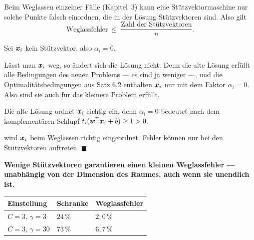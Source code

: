 \begin{merksatz}
Beim Weglassen einzelner Fälle (Kapitel~3) kann eine Stützvektormaschine nur solche Punkte falsch einordnen, die in der Lösung Stützvektoren sind. Also gilt
\[ \text{Weglassfehler} \ \le\ \frac{\text{Zahl der Stützvektoren}}{n} . \]

Sei $\boldsymbol{x}_i$ kein Stützvektor, also $\alpha_i = 0$.

 Lässt man $\boldsymbol{x}_i$ weg, so ändert sich die Lösung nicht. Denn die alte Lösung erfüllt alle Bedingungen des neuen Problems --- es sind ja weniger ---, und die Optimalitätsbedingungen aus Satz 6.2 enthalten $\boldsymbol{x}_i$ nur mit dem Faktor $\alpha_i = 0$. Also sind sie auch für das kleinere Problem erfüllt.

 Die alte Lösung ordnet $\boldsymbol{x}_i$ richtig ein, denn $\alpha_i = 0$ bedeutet nach dem komplementären Schlupf $t_i(\boldsymbol{w}^{\!\top}\boldsymbol{x}_i + b) \ge 1 > 0$.

 wird $\boldsymbol{x}_i$ beim Weglassen richtig eingeordnet. Fehler können nur bei den Stützvektoren auftreten. $\blacksquare$

\begin{center}
\begin{minipage}{0.9\textwidth}
\textbf{Wenige Stützvektoren garantieren einen kleinen Weglassfehler --- unabhängig von der Dimension des Raumes, auch wenn sie unendlich ist.}
\end{minipage}
\end{center}

\begin{center}
{\small
\renewcommand{\arraystretch}{1.48}
\begin{tabular}{@{}P{2.4cm}P{2.4cm}P{2.4cm}@{}}
\toprule
\textbf{Einstellung} & \textbf{Schranke} & \textbf{Weglassfehler}\\
\midrule
$C = 3$, $\gamma = 3$ & $24\,\%$ & $2{,}0\,\%$\\
$C = 3$, $\gamma = 30$ & $73\,\%$ & $6{,}7\,\%$\\
\bottomrule
\end{tabular}}
\end{center}

\begin{center}
\begin{minipage}{0.88\textwidth}
\end{minipage}
\end{center}
\end{merksatz}

